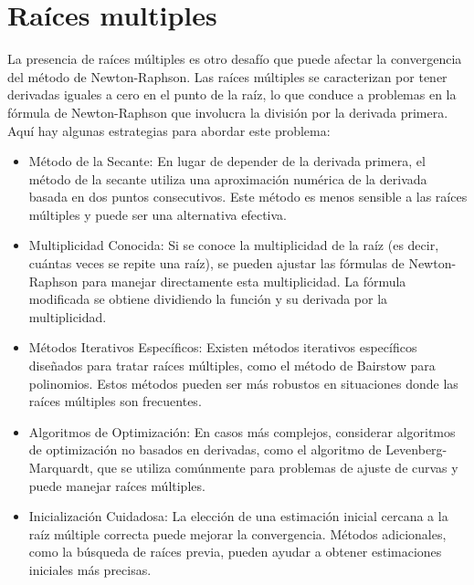 \documentclass[conference]{IEEEtran}
\begin{document}
\section{Raíces multiples}

La presencia de raíces múltiples es otro desafío que puede afectar la
convergencia del método de Newton-Raphson. Las raíces múltiples se
caracterizan por tener derivadas iguales a cero en el punto de la raíz, lo que
conduce a problemas en la fórmula de Newton-Raphson que involucra la
división por la derivada primera. Aquí hay algunas estrategias para
abordar este problema:

\begin{itemize}
	\item Método de la Secante: En lugar de depender de la derivada primera,
	      el método de la secante utiliza una aproximación numérica de la derivada
	      basada en dos puntos consecutivos. Este método es menos sensible a las
	      raíces múltiples y puede ser una alternativa efectiva.

	\item Multiplicidad Conocida:
	      Si se conoce la multiplicidad de la raíz (es decir, cuántas veces
	      se repite una raíz), se pueden ajustar las fórmulas de Newton-Raphson
	      para manejar directamente esta multiplicidad. La fórmula
	      modificada se obtiene dividiendo la función y su derivada
	      por la multiplicidad.

	\item Métodos Iterativos Específicos:
	      Existen métodos iterativos específicos diseñados para tratar
	      raíces múltiples, como el método de Bairstow para polinomios.
	      Estos métodos pueden ser más robustos en situaciones donde las
	      raíces múltiples son frecuentes.

	\item Algoritmos de Optimización:
	      En casos más complejos, considerar algoritmos de optimización no
	      basados en derivadas, como el algoritmo de Levenberg-Marquardt, que
	      se utiliza comúnmente para problemas de ajuste de curvas y puede
	      manejar raíces múltiples.

	\item Inicialización Cuidadosa:
	      La elección de una estimación inicial cercana a la raíz múltiple
	      correcta puede mejorar la convergencia. Métodos adicionales, como
	      la búsqueda de raíces previa, pueden ayudar a obtener estimaciones
	      iniciales más precisas.

\end{itemize}
\end{document}
